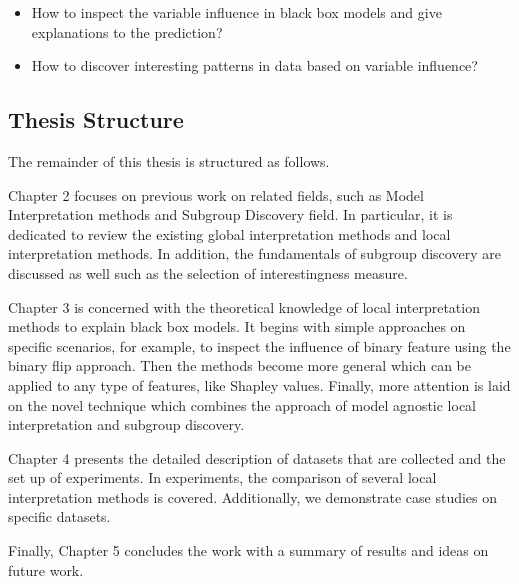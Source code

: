 \begin{itemize}
	\item How to inspect the variable influence in black box models and give explanations to the prediction?
	
	\item How to discover interesting patterns in data based on variable influence?
	
\end{itemize}


\subsection{Thesis Structure}

The remainder of this thesis is structured as follows. 

Chapter 2 focuses on previous work on related fields, such as Model Interpretation methods and Subgroup Discovery field. In particular, it is dedicated to review the existing global interpretation methods and local interpretation methods. In addition, the fundamentals of subgroup discovery are discussed as well such as the selection of interestingness measure.

Chapter 3 is concerned with the theoretical knowledge of local interpretation methods to explain black box models. It begins with simple approaches on specific scenarios, for example, to inspect the influence of binary feature using the binary flip approach. Then the methods become more general which can be applied to any type of features, like Shapley values. Finally, more attention is laid on the novel technique which combines the approach of model agnostic local interpretation and subgroup discovery.

Chapter 4 presents the detailed description of datasets that are collected and the set up of experiments. In experiments, the comparison of several local interpretation methods is covered. Additionally, we demonstrate case studies on specific datasets. 

Finally, Chapter 5 concludes the work with a summary of results and ideas on future work. 